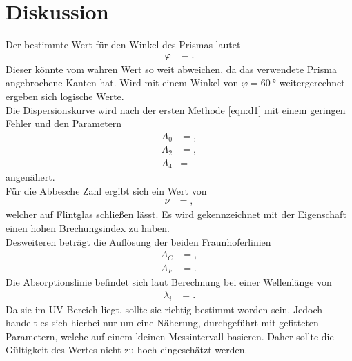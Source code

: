 \section{Diskussion}
\label{sec:Diskussion}
Der bestimmte Wert für den Winkel des Prismas lautet
\begin{align*}
  \varphi &= .
\end{align*}
Dieser könnte vom wahren Wert so weit abweichen, da das verwendete Prisma angebrochene Kanten hat.
Wird mit einem Winkel von $\varphi = \SI{60}{\degree}$ weitergerechnet ergeben sich logische Werte.\\
Die Dispersionskurve wird nach der ersten Methode \eqref{eqn:d1} mit einem geringen Fehler und den Parametern
\begin{align*}
A_0 &= ,\\
A_2 &= ,\\
A_4 &= 
\end{align*}
angenähert.\\
Für die Abbesche Zahl ergibt sich ein Wert von
\begin{align*}
  \nu &= ,
\end{align*}
welcher auf Flintglas schließen lässt.
Es wird gekennzeichnet mit der Eigenschaft einen hohen Brechungsindex zu haben.\\
Desweiteren beträgt die Auflösung der beiden Fraunhoferlinien
\begin{align*}
A_C &= ,\\
A_F &= .
\end{align*}
Die Absorptionslinie befindet sich laut Berechnung bei einer Wellenlänge von
\begin{align*}
  \lambda_i &= .
\end{align*}
Da sie im UV-Bereich liegt, sollte sie richtig bestimmt worden sein.
Jedoch handelt es sich hierbei nur um eine Näherung, durchgeführt mit gefitteten Parametern, welche auf einem kleinen Messintervall basieren.
Daher sollte die Gültigkeit des Wertes nicht zu hoch eingeschätzt werden.


